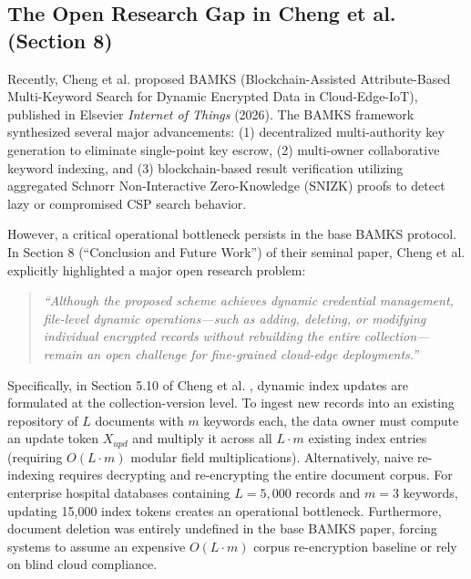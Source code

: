 \documentclass[journal,10pt,twocolumn]{IEEEtran}
\begin{document}
\subsection{The Open Research Gap in Cheng et al. \cite{cheng2026bamks} (Section 8)}
Recently, Cheng et al. \cite{cheng2026bamks} proposed BAMKS (Blockchain-Assisted Attribute-Based Multi-Keyword Search for Dynamic Encrypted Data in Cloud-Edge-IoT), published in Elsevier \textit{Internet of Things} (2026). The BAMKS framework synthesized several major advancements: (1) decentralized multi-authority key generation to eliminate single-point key escrow, (2) multi-owner collaborative keyword indexing, and (3) blockchain-based result verification utilizing aggregated Schnorr Non-Interactive Zero-Knowledge (SNIZK) proofs \cite{schnorr1991} to detect lazy or compromised CSP search behavior.

However, a critical operational bottleneck persists in the base BAMKS protocol. In Section 8 (``Conclusion and Future Work'') of their seminal paper, Cheng et al. explicitly highlighted a major open research problem:
\begin{quote}
\textit{``Although the proposed scheme achieves dynamic credential management, file-level dynamic operations—such as adding, deleting, or modifying individual encrypted records without rebuilding the entire collection—remain an open challenge for fine-grained cloud-edge deployments.''} \cite{cheng2026bamks}
\end{quote}
Specifically, in Section 5.10 of Cheng et al. \cite{cheng2026bamks}, dynamic index updates are formulated at the collection-version level. To ingest new records into an existing repository of $L$ documents with $m$ keywords each, the data owner must compute an update token $X_{upd}$ and multiply it across all $L \cdot m$ existing index entries (requiring $O(L \cdot m)$ modular field multiplications). Alternatively, naive re-indexing requires decrypting and re-encrypting the entire document corpus. For enterprise hospital databases containing $L = 5,000$ records and $m = 3$ keywords, updating 15,000 index tokens creates an operational bottleneck. Furthermore, document deletion was entirely undefined in the base BAMKS paper, forcing systems to assume an expensive $O(L \cdot m)$ corpus re-encryption baseline or rely on blind cloud compliance.
\end{document}
